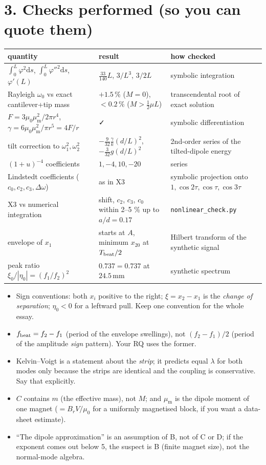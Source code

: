 \documentclass[11pt,a4paper]{article}
\newcommand{\muz}{\mu_0}\newcommand{\mum}{\mu_{\mathrm m}}\newcommand{\dd}{\mathrm{d}}\newcommand{\un}[1]{\,\mathrm{#1}}\newcommand{\Lag}{\mathcal L}
\begin{document}
\section*{3. Checks performed (so you can quote them)}
\begin{center}\footnotesize
\begin{tabular}{@{}p{5.4cm}p{5.0cm}p{5.0cm}@{}}\toprule
quantity & result & how checked\\ \midrule
$\int_0^L\varphi^2\dd s$, $\int_0^L\varphi''^2\dd s$, $\varphi'(L)$ & $\tfrac{33}{140}L$, $3/L^3$, $3/2L$ & symbolic integration\\
Rayleigh $\omega_0$ vs exact cantilever+tip mass & $+1.5\,\%$ ($M=0$), $<0.2\,\%$ ($M>\tfrac12\mu L$) & transcendental root of exact solution\\
$F=3\muz\mum^2/2\pi r^4$, $\gamma=6\muz\mum^2/\pi r^5=4F/r$ & ✓ & symbolic differentiation\\
tilt correction to $\omega_1^2,\omega_2^2$ & $-\tfrac{9}{32}\tfrac{\gamma}{k}(d/L)^2$, $-\tfrac{3}{32}g(d/L)^2$ & 2nd-order series of the tilted-dipole energy\\
$(1+u)^{-4}$ coefficients & $1,-4,10,-20$ & series\\
Lindstedt coefficients ($c_0,c_2,c_3,\Delta\omega$) & as in X3 & symbolic projection onto $1,\cos2\tau,\cos\tau,\cos3\tau$\\
X3 vs numerical integration & shift, $c_2$, $c_3$, $c_0$ within 2--5 \% up to $a/d=0.17$ & \texttt{nonlinear\_check.py}\\
envelope of $x_1$ & starts at $A$, minimum $x_{20}$ at $T_{\rm beat}/2$ & Hilbert transform of the synthetic signal\\
peak ratio $\xi_0/|\eta_0|=(f_1/f_2)^2$ & $0.737=0.737$ at $24.5\un{mm}$ & synthetic spectrum\\ \bottomrule
\end{tabular}
\end{center}

\begin{warnbox}
\begin{itemize}
\item Sign conventions: both $x_i$ positive to the right; $\xi=x_2-x_1$ is the \emph{change of separation}; $\eta_0<0$ for a leftward pull. Keep one convention for the whole essay.
\item $f_{\rm beat}=f_2-f_1$ (period of the envelope swellings), not $(f_2-f_1)/2$ (period of the amplitude \emph{sign} pattern). Your RQ uses the former.
\item Kelvin--Voigt is a statement about the \emph{strip}; it predicts equal $\lambda$ for both modes only because the strips are identical and the coupling is conservative. Say that explicitly.
\item $C$ contains $m$ (the effective mass), not $M$; and $\mum$ is the dipole moment of one magnet ($=B_r V/\muz$ for a uniformly magnetised block, if you want a data-sheet estimate).
\item ``The dipole approximation'' is an assumption of B, not of C or D; if the exponent comes out below 5, the suspect is B (finite magnet size), not the normal-mode algebra.
\end{itemize}
\end{warnbox}
\end{document}
